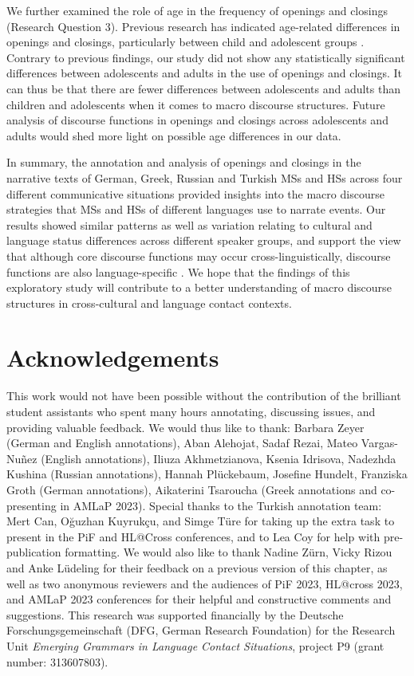 \documentclass[output=paper,colorlinks,citecolor=brown]{langscibook}
\begin{document}
We further examined the role of age in the frequency of openings and closings (Research Question 3). Previous research has indicated age-related differences in openings and closings, particularly between child and adolescent groups \parencite{dollnick_entwicklung_2013, tolchinsky_text_2002}. Contrary to previous findings, our study did not show any statistically significant differences between adolescents and adults in the use of openings and closings. It can thus be that there are fewer differences between adolescents and adults than children and adolescents when it comes to macro discourse structures. Future analysis of discourse functions in openings and closings across adolescents and adults would shed more light on possible age differences in our data.  

In summary, the annotation and analysis of openings and closings in the narrative texts of German, Greek, Russian and Turkish MSs and HSs across four different communicative situations provided insights into the macro discourse strategies that MSs and HSs of different languages use to narrate events. Our results showed similar patterns as well as variation relating to cultural and language status differences across different speaker groups, and support the view that although core discourse functions may occur cross-linguistically, discourse functions are also language-specific \parencite[see e.g.][]{Marquez_telephone_2010}. We hope that the findings of this exploratory study will contribute to a better understanding of macro discourse structures in cross-cultural and language contact contexts. 

\section*{Acknowledgements}
This work would not have been possible without the contribution of the brilliant student assistants who spent many hours annotating, discussing issues, and providing valuable feedback. We would thus like to thank: Barbara Zeyer (German and English annotations), Aban Alehojat, Sadaf Rezai, Mateo Vargas-Nuñez (English annotations), Iliuza Akhmetzianova,  Ksenia Idrisova, Nadezhda Kushina (Russian annotations), Hannah Plückebaum, Josefine Hundelt, Franziska Groth (German annotations), Aikaterini Tsaroucha (Greek annotations and co\hyp presenting in AMLaP 2023). Special thanks to the Turkish annotation team: Mert Can, Oğuzhan Kuyrukçu, and Simge Türe for taking up the extra task to present in the PiF and HL@Cross conferences, and to Lea Coy for help with pre-publication formatting.  
We would also like to thank Nadine Zürn, Vicky Rizou and Anke Lüdeling for their feedback on a previous version of this chapter, as well as two anonymous reviewers and the audiences of PiF 2023, HL@cross 2023, and AMLaP 2023 conferences for their helpful and constructive comments and suggestions. 
This research was supported financially by the Deutsche Forschungsgemeinschaft (DFG, German Research Foundation) for the Research Unit \textit{Emerging Grammars in Language Contact Situations}, project P9 (grant number: 313607803).

\sloppy
\printbibliography[heading=subbibliography,notkeyword=this]
\end{document}
